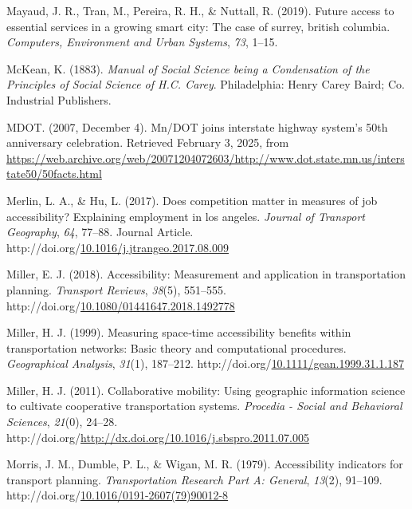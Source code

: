 \documentclass[
11pt, %
oneside, %
english, %
singlespacing, %
]{macthesis} %
\newlength{\cslhangindent}
\newenvironment{CSLReferences}[2] %
{\begin{list}{}{%
	\setlength{\itemindent}{0pt}
	\setlength{\leftmargin}{0pt}
	\setlength{\parsep}{0pt}
	\ifodd #1
	\setlength{\leftmargin}{\cslhangindent}
	\setlength{\itemindent}{-1\cslhangindent}
	\fi
	\setlength{\itemsep}{#2\baselineskip}}}
{\end{list}}
\begin{document}
\begin{CSLReferences}{1}{0}
Mayaud, J. R., Tran, M., Pereira, R. H., \& Nuttall, R. (2019). Future access to essential services in a growing smart city: The case of surrey, british columbia. \emph{Computers, Environment and Urban Systems}, \emph{73}, 1--15.

McKean, K. (1883). \emph{Manual of {Social} {Science} being a {Condensation} of the {Principles} of {Social} {Science} of {H}.{C}. {Carey}}. Philadelphia: Henry Carey Baird; Co. Industrial Publishers.

MDOT. (2007, December 4). Mn/{DOT} joins interstate highway system's 50th anniversary celebration. Retrieved February 3, 2025, from \url{https://web.archive.org/web/20071204072603/http://www.dot.state.mn.us/interstate50/50facts.html}

Merlin, L. A., \& Hu, L. (2017). Does competition matter in measures of job accessibility? Explaining employment in los angeles. \emph{Journal of Transport Geography}, \emph{64}, 77--88. Journal Article. http://doi.org/\href{https://doi.org/10.1016/j.jtrangeo.2017.08.009}{10.1016/j.jtrangeo.2017.08.009}

Miller, E. J. (2018). Accessibility: Measurement and application in transportation planning. \emph{Transport Reviews}, \emph{38}(5), 551--555. http://doi.org/\href{https://doi.org/10.1080/01441647.2018.1492778}{10.1080/01441647.2018.1492778}

Miller, H. J. (1999). Measuring space‐time accessibility benefits within transportation networks: Basic theory and computational procedures. \emph{Geographical Analysis}, \emph{31}(1), 187--212. http://doi.org/\href{https://doi.org/10.1111/gean.1999.31.1.187}{10.1111/gean.1999.31.1.187}

Miller, H. J. (2011). Collaborative mobility: Using geographic information science to cultivate cooperative transportation systems. \emph{Procedia - Social and Behavioral Sciences}, \emph{21}(0), 24--28. http://doi.org/\url{http://dx.doi.org/10.1016/j.sbspro.2011.07.005}

Morris, J. M., Dumble, P. L., \& Wigan, M. R. (1979). Accessibility indicators for transport planning. \emph{Transportation Research Part A: General}, \emph{13}(2), 91--109. http://doi.org/\href{https://doi.org/10.1016/0191-2607(79)90012-8}{10.1016/0191-2607(79)90012-8}


\end{CSLReferences}
\end{document}
